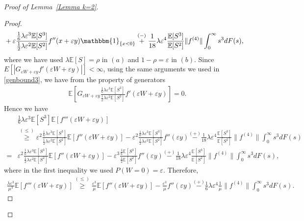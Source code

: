 \documentclass[11pt,letterpaper,reqno]{article}
\theoremstyle{thmstyleone}%
\theoremstyle{thmstyletwo}%
\theoremstyle{thmstylethree}%
\numberwithin{equation}{section}
\begin{document}
\begin{proof}[Proof of Lemma~\ref{Lemma k=2}]
\begin{proof}
\begin{align*}
    &+\varepsilon \frac{\frac{1}{6}\lambda \varepsilon^3 \mathbb E[S^3]}{\frac{1}{2}\lambda \varepsilon^2 \mathbb E[S^2]} f''(x+\varepsilon y)\mathbbm{1}_{\{x<0\}}\stackrel{(-)}{+}\frac{1}{18} \lambda \varepsilon^4 \frac{\mathbb E[S^3]}{\mathbb E[S^2]} \|f^{(4)}\|\int_0^\infty s^3 dF(s),
\end{align*}
where we have used $\lambda \mathbb E[S]=\rho$ in $(a)$ and $1-\rho=\varepsilon$ in $(b)$. Since $E\left[| G_{\varepsilon W+\varepsilon y}f'(\varepsilon W+\varepsilon y)|\right]< \infty$, using the same arguments we used in \eqref{genbound3}, we have from the property of generators
\begin{align*}
   \mathbb E\left[ G_{\varepsilon W+\varepsilon y}\frac{\frac{1}{6}\lambda \varepsilon^3 \mathbb E[S^3]}{\frac{1}{2}\lambda \varepsilon^2 \mathbb E[S^2]}f'(\varepsilon W+\varepsilon y)\right]=0.
\end{align*}
Hence we have
\begin{align*}
    &\frac{1}{6}\lambda \varepsilon^3 \mathbb E[S^3]\mathbb E[f'''(\varepsilon W+\varepsilon y)]\\ &\stackrel{(\leq)} {\geq} \varepsilon^2\frac{\frac{1}{6}\lambda \varepsilon^3 \mathbb E[S^3]}{\frac{1}{2}\lambda \varepsilon^2 \mathbb E[S^2]}\mathbb E[f''(\varepsilon W+\varepsilon y)]-\varepsilon^2 \frac{\frac{1}{6}\lambda \varepsilon^3 \mathbb E[S^3]}{\frac{1}{2}\lambda \varepsilon^2 \mathbb E[S^2]} f''(\varepsilon y)       \stackrel{(+)}{-}\frac{1}{18} \lambda \varepsilon^4 \frac{\mathbb E[S^3]}{\mathbb E[S^2]} \|f^{(4)}\|\int_0^\infty s^3 dF(s)\\
        =  &\varepsilon^2\frac{\frac{1}{6}\lambda \varepsilon^3 \mathbb E[S^3]}{\frac{1}{2}\lambda \varepsilon^2 \mathbb E[S^2]}\mathbb E[f''(\varepsilon W+\varepsilon y)]-\varepsilon^3\frac{\frac{1}{6}\mathbb E[S^3]}{\frac{1}{2} \mathbb E[S^2]} f''(\varepsilon y)
        \stackrel{(+)}{-}\frac{1}{18} \lambda \varepsilon^4 \frac{\mathbb E[S^3]}{\mathbb E[S^2]} \|f^{(4)}\|\int_0^\infty s^3 dF(s),
\end{align*}
where in the first inequality we used $P(W=0)=\varepsilon$. Therefore,
\begin{align}\label{stg2}
    \frac{\lambda \varepsilon^3}{\mu^3}\mathbb E[f'''(\varepsilon W+\varepsilon y)] \stackrel{(\leq)} {\geq} \frac{\varepsilon^3}{\mu}\mathbb E[f''(\varepsilon W+\varepsilon y)]-\frac{\varepsilon^3}{\mu}f''(\varepsilon y)\stackrel{(+)}{-}\frac{1}{6} \lambda \varepsilon^4 \frac{1}{\mu} \|f^{(4)}\|\int_0^\infty s^3 dF(s).
\end{align}
\end{proof}

\end{proof}
\end{document}
